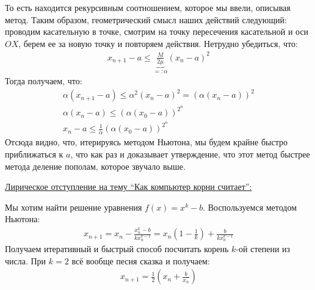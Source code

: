 То есть находится рекурсивным соотношением, которое мы ввели, описывая метод. Таким образом, геометрический смысл наших действий следующий: 
проводим касательную в точке, смотрим на точку пересечения касательной и оси $OX$, берем ее за новую точку и повторяем действия. 
Нетрудно убедиться, что:
\begin{gather*}
    x_{n+1} - a \leqslant \underbrace{\frac{M}{2\mu}}_{=:\alpha} (x_n - a)^2
\end{gather*}
Тогда получаем, что: 
\begin{gather*}
    \alpha(x_{n+1} - a) \leqslant \alpha^2 (x_n - a)^2 = (\alpha(x_n - a))^2 \\
    \alpha(x_n - a) \leqslant (\alpha (x_0 - a))^{2^n} \\
    x_n - a \leqslant \frac{1}{\alpha} (\alpha(x_0 - a))^{2^n}
\end{gather*}
Отсюда видно, что, итерируясь методом Ньютона, мы будем крайне быстро приближаться к $a$, 
что как раз и доказывает утверждение, что этот метод быстрее метода деление пополам, которое звучало выше.
\begin{center}
    \underline{Лирическое отступление на тему ``Как компьютер корни считает'':}
\end{center}
\vspace*{0.25cm}
Мы хотим найти решение уравнения $f(x) = x^k - b$. Воспользуемся методом Ньютона: 
\begin{gather*}
    x_{n+1} = x_n - \frac{x_n^k - b}{k x_n^{k-1}} = x_n(1 - \frac{1}{k}) + \frac{b}{k x_n^{k-1}}
\end{gather*}
Получаем итеративный и быстрый способ посчитать корень $k$-ой степени из числа. При $k=2$ всё вообще песня сказка и получаем: 
\begin{gather*}
    x_{n+1} = \frac{1}{2}(x_n + \frac{b}{x_n})
\end{gather*}
